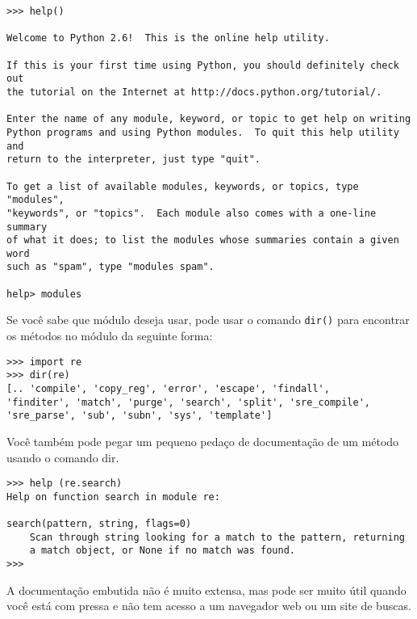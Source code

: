 \beforeverb
\begin{verbatim}
>>> help()

Welcome to Python 2.6!  This is the online help utility.

If this is your first time using Python, you should definitely check out
the tutorial on the Internet at http://docs.python.org/tutorial/.

Enter the name of any module, keyword, or topic to get help on writing
Python programs and using Python modules.  To quit this help utility and
return to the interpreter, just type "quit".

To get a list of available modules, keywords, or topics, type "modules",
"keywords", or "topics".  Each module also comes with a one-line summary
of what it does; to list the modules whose summaries contain a given word
such as "spam", type "modules spam".

help> modules
\end{verbatim}
\afterverb
%

Se você sabe que módulo deseja usar, pode usar o comando {\tt dir()} para
encontrar os métodos no módulo da seguinte forma:

\beforeverb
\begin{verbatim}
>>> import re
>>> dir(re)
[.. 'compile', 'copy_reg', 'error', 'escape', 'findall', 
'finditer', 'match', 'purge', 'search', 'split', 'sre_compile', 
'sre_parse', 'sub', 'subn', 'sys', 'template']
\end{verbatim}
\afterverb
%
Você também pode pegar um pequeno pedaço de documentação de um método usando
o comando dir.

\beforeverb
\begin{verbatim}
>>> help (re.search)
Help on function search in module re:

search(pattern, string, flags=0)
    Scan through string looking for a match to the pattern, returning
    a match object, or None if no match was found.
>>> 
\end{verbatim}
\afterverb
%
A documentação embutida não é muito extensa, mas pode ser muito útil quando
você está com pressa e não tem acesso a um navegador web ou um site de buscas.

